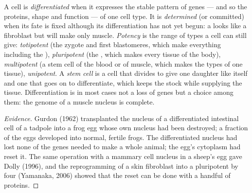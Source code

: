 \begin{definition}\label{def:b2:cell-differentiation:differentiation}
A cell is \emph{differentiated} when it expresses the stable
pattern of genes --- and so the proteins, shape and function --- of
one cell type. It is \emph{determined} (or committed) when its fate
is fixed although its differentiation has not yet begun: a 
looks like a fibroblast but will make only muscle. \emph{Potency} is
the range of types a cell can still give: \emph{totipotent} (the
zygote and first blastomeres, which make everything including the
), \emph{pluripotent} (the , which makes
every tissue of the body), \emph{multipotent} (a stem cell of the
blood or of muscle, which makes the types of one tissue),
\emph{unipotent}. A \emph{stem cell} is a cell that divides to give
one daughter like itself and one that goes on to differentiate,
which keeps the stock while supplying the tissue. Differentiation
is in most cases not a loss of genes but a choice among them: the
genome of a muscle nucleus is complete.
\end{definition}
\begin{proof}[Evidence]
Gurdon (1962) transplanted the nucleus of a differentiated
intestinal cell of a tadpole into a frog egg whose own nucleus had
been destroyed; a fraction of the eggs developed into normal,
fertile frogs. The differentiated nucleus had lost none of the
genes needed to make a whole animal; the egg's cytoplasm had reset
it. The same operation with a mammary cell nucleus in a sheep's egg
gave Dolly (1996), and the reprogramming of a skin fibroblast into
a pluripotent  by four  (Yamanaka,
2006) showed that the reset can be done with a handful of proteins.
\end{proof}

